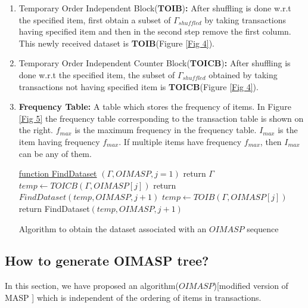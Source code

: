 \documentclass[review]{elsarticle}
\begin{document}
\begin{enumerate}[1.]
\item Temporary Order Independent Block(\textbf{TOIB})\textbf{:} After shuffling is done w.r.t the specified item, first obtain a subset of $ \Gamma _{shuffled} $ by taking transactions having specified item and then in the second step remove the first column. This newly received dataset is \textbf{TOIB}(Figure \ref{Fig 4}).

\item Temporary Order Independent Counter Block(\textbf{TOICB})\textbf{:} After shuffling is done w.r.t the specified item, the subset of $ \Gamma _{shuffled} $ obtained by taking transactions not having specified item is \textbf{TOICB}(Figure \ref{Fig 4}).

\item \textbf{Frequency Table:} A table which stores the frequency of items. In Figure \ref{Fig 5} the frequency table corresponding to the transaction table is shown on the right. $ f_{max} $ is the maximum frequency in the frequency table. $ I_{max} $ is the item having frequency $ f_{max} $. If multiple items have frequency $ f_{max} $, then $ I_{max} $ can be any of them.

\begin{algorithm}

    \underline{function FindDataset} $ (\Gamma, OIMASP, j = 1) $\;
      {
        return $ \Gamma $
      }     
      {
        $ temp \leftarrow TOICB(\Gamma, OIMASP[j]) $\;
		return $ FindDataset(temp, OIMASP, j+1) $
      }
      {
		$ temp \leftarrow TOIB(\Gamma, OIMASP[j]) $\;
		return FindDataset$(temp, OIMASP, j+1)$
      }      
    \caption{Algorithm to obtain the dataset associated with an $ OIMASP $ sequence}
\end{algorithm}

\end{enumerate}

\subsection{How to generate OIMASP tree?}
In this section, we have proposed an algorithm($ OIMASP $)[modified version of MASP \cite{oldmasp}] which is independent of the ordering of items in transactions.
\end{document}
